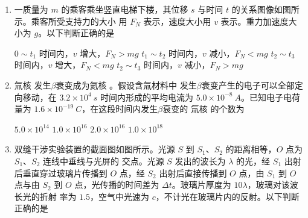 


\gaokaoxz


\begin{enumerate}
\item
一质量为 $ m $ 的乘客乘坐竖直电梯下楼，其位移 $ s $ 与时间 $ t $ 的关系图像如图所示。乘客所受支持力的大小
用 $ F_{N} $ 表示，速度大小用 $ v $ 表示。重力加速度大小为 $ g $。以下判断正确的是  
\begin{figure}[h!]
\centering

\end{figure}


\fourchoices
{$ 0 \sim t_{1} $ 时间内，$ v $ 增大，$ F_{N} >mg $}
{$ t_{1} \sim t_{2} $ 时间内，$ v $ 减小，$ F_{N} <mg $}
{$ t_{2} \sim t_{3} $ 时间内，$ v $ 增大，$ F_{N} <mg $}
{$ t_{2} \sim t_{3} $ 时间内，$ v $ 减小，$ F_{N} >mg $}





\item
氚核  发生$ \beta $衰变成为氦核  。假设含氚材料中  发生$ \beta $衰变产生的电子可以全部定向移动，在 $ 3.2 \times 10^{4} \ s $ 时间内形成的平均电流为 $ 5.0 \times 10^{-8} \ A $。已知电子电荷量为 $ 1.6 \times 10^{-19} \ C $，在这段时间内发生$ \beta $衰变的
氚核  的个数为  

\fourchoices
{$5.0 \times 10^{14}$}
{$1.0 \times 10^{16}$}
{$ 2.0 \times 10^{16}$}
{$1.0 \times 10^{18}$}






\item
双缝干涉实验装置的截面图如图所示。光源 $ S $ 到 $ S_{1} $、$ S_{2} $ 的距离相等，$ O $ 点为 $ S_{1} $、$ S_{2} $ 连线中垂线与光屏的
交点。光源 $ S $ 发出的波长为 $ \lambda $ 的光，经 $ S_{1} $ 出射后垂直穿过玻璃片传播到 $ O $ 点，经 $ S_{2} $ 出射后直接传播到
$ O $ 点，由 $ S_{1} $ 到 $ O $ 点与由 $ S_{2} $ 到 $ O $ 点，光传播的时间差为 $ \Delta t $。玻璃片厚度为 $ 10\lambda $，玻璃对该波长光的折射
率为 $ 1.5 $，空气中光速为 $ c $，不计光在玻璃片内的反射。以下判断正确的是  
\begin{figure}[h!]
\centering

\end{figure}



\end{enumerate}
